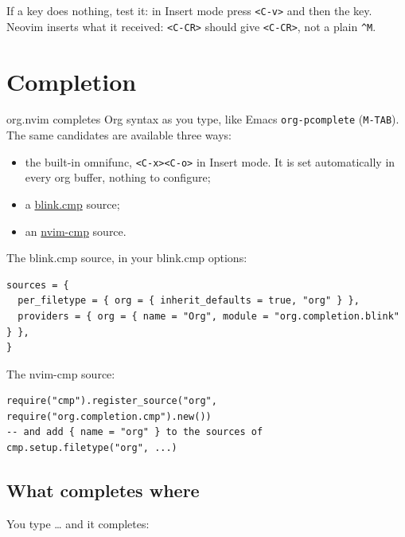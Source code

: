 If a key does nothing, test it: in Insert mode press \texttt{<C-v>} and then the
key. Neovim inserts what it received: \texttt{<C-CR>} should give \texttt{<C-CR>}, not
a plain \texttt{\textasciicircum{}M}.
\section{Completion}
\label{sec:org97668aa}
org.nvim completes Org syntax as you type, like Emacs \texttt{org-pcomplete}
(\texttt{M-TAB}). The same candidates are available three ways:

\begin{itemize}
\item the built-in omnifunc, \texttt{<C-x><C-o>} in Insert mode. It is set
automatically in every org buffer, nothing to configure;
\item a \href{https://github.com/Saghen/blink.cmp}{blink.cmp} source;
\item an \href{https://github.com/hrsh7th/nvim-cmp}{nvim-cmp} source.
\end{itemize}

The blink.cmp source, in your blink.cmp options:

\begin{verbatim}
sources = {
  per_filetype = { org = { inherit_defaults = true, "org" } },
  providers = { org = { name = "Org", module = "org.completion.blink" } },
}
\end{verbatim}

The nvim-cmp source:

\begin{verbatim}
require("cmp").register_source("org", require("org.completion.cmp").new())
-- and add { name = "org" } to the sources of cmp.setup.filetype("org", ...)
\end{verbatim}
\subsection{What completes where}
\label{sec:orgd2d6e17}
You type \ldots{} and it completes:

